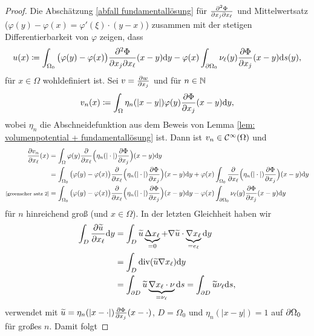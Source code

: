 \begin{proof}
	Die Abschätzung \eqref{abfall fundamentallösung} für \(\frac{\partial^2\Phi}{\partial x_j\partial x_\ell}\) und Mittelwertsatz (\(\varphi(y)-\varphi(x)=\varphi'(\xi)\cdot(y-x)\)) zusammen mit der stetigen Differentierbarkeit von \(\varphi\) zeigen, dass
	\begin{equation*}
		u(x)\coloneqq\int_{\Omega_0}\big(\varphi(y)-\varphi(x)\big)\frac{\partial^2\Phi}{\partial x_j\partial x_\ell}(x-y)\mathrm{d}y-\varphi(x)\int_{\partial\Omega_0}\nu_\ell(y)\frac{\partial\Phi}{\partial x_j}(x-y)\mathrm{d}s(y),
	\end{equation*}
	für \(x\in\Omega\) wohldefiniert ist. Sei \(v=\frac{\partial w}{\partial x_j}\) und für \(n\in\mathbb{N}\) 
	\begin{equation*}
		v_n(x)\coloneqq\int_\Omega\eta_n(|x-y|)\varphi(y)\frac{\partial\Phi}{\partial x_j}(x-y)\mathrm{d}y,
	\end{equation*}
	wobei \(\eta_n\) die Abschneidefunktion aus dem Beweis von Lemma \ref{lem: volumenpotential + fundamentallösung} ist. Dann ist \(v_n\in\mathcal{C}^\infty(\Omega)\) und
	\begin{align*}
		\frac{\partial v_n}{\partial x_\ell}(x)
		&=\int_\Omega\varphi(y)\frac{\partial}{\partial x_\ell}\Big(\eta_n(|\cdot|)\frac{\partial\Phi}{\partial x_j}\Big)(x-y)\mathrm{d}y\\
		&=\int_{\Omega_0}\big(\varphi(y)-\varphi(x)\big)\frac{\partial}{\partial x_\ell}\Big(\eta_n(|\cdot|)\frac{\partial\Phi}{\partial x_j}\Big)(x-y)\mathrm{d}y
		+\varphi(x)\int_{\Omega_0}\frac{\partial}{\partial x_\ell}\Big(\eta_n(|\cdot|)\frac{\partial\Phi}{\partial x_j}\Big)(x-y)\mathrm{d}y\\
		\scriptsize\eqref{greenscher satz 2}&=\int_{\Omega_0}\big(\varphi(y)-\varphi(x)\big)\frac{\partial}{\partial x_\ell}\Big(\eta_n(|\cdot|)\frac{\partial\Phi}{\partial x_j}\Big)(x-y)\mathrm{d}y
		-\varphi(x)\int_{\partial\Omega_0}\nu_\ell(y)\frac{\partial\Phi}{\partial x_j}(x-y)\mathrm{d}y
	\end{align*}
	für \(n\) hinreichend groß (und \(x\in\Omega\)). In der letzten Gleichheit haben wir 
	\begin{align*}
		\int_D\frac{\partial\widetilde{u}}{\partial x_\ell}\mathrm{d}y&
		=\int_D\widetilde{u}\underbrace{\Delta x_\ell}_{=0}+\nabla\widetilde{u}\cdot\underbrace{\nabla x_\ell}_{=e_\ell}\mathrm{d}y\\
		&=\int_D\operatorname{div}(\widetilde{u}\nabla x_\ell)\mathrm{d}y\\
		&=\int_{\partial D}\widetilde{u}\underbrace{ \nabla x_\ell\cdot\nu }_{=\nu_\ell}\mathrm{d}s
		=\int_{\partial D}\widetilde{u}\nu_\ell\mathrm{d}s,
	\end{align*}
	verwendet mit \(\widetilde{u}=\eta_n(|x-\cdot|)\frac{\partial\Phi}{\partial x_j}(x-\cdot)\), \(D=\Omega_0\) und \(\eta_n(|x-y|)=1\) auf \(\partial\Omega_0\) für großes \(n\). Damit folgt

\end{proof}
